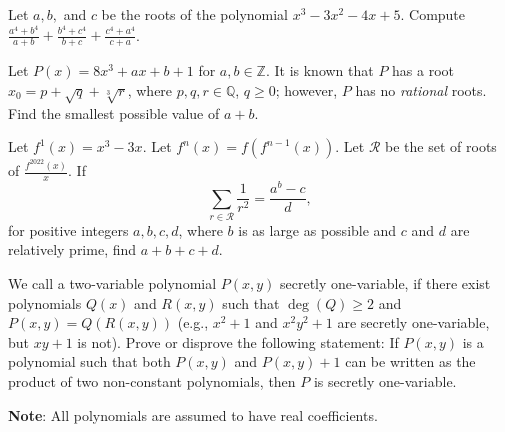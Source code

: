 %	



\begin{question}[name={2022 Stanford Math Tournament, \href{https://artofproblemsolving.com/community/c4h2874565p25539362}{Team Round \#5}}]
	Let $a, b,$ and $c$ be the roots of the polynomial $x^3 - 3x^2 - 4x + 5$. Compute $\frac{a^4 + b^4}{a + b}+\frac{b^4 + c^4}{b + c}+\frac{c^4 + a^4}{c + a}$.
\end{question}



%	


\begin{question}[name={2022 Stanford Math Tournament, \href{https://artofproblemsolving.com/community/c383h3040303p27371394}{Algebra \#9}}]
	Let $P(x)=8x^3+ax+b+1$ for $a,b\in\mathbb{Z}$. It is known that $P$ has a root $x_0=p+\sqrt{q}+\sqrt[3]{r}$, where $p,q,r\in\mathbb{Q}$, $q\ge0$; however, $P$ has no \textit{rational} roots. Find the smallest possible value of $a+b$.	
\end{question}



%	




\begin{question}[name={2022 Stanford Math Tournament, \href{https://artofproblemsolving.com/community/c383h3040320p27371581}{Algebra \#10}}]
	Let $f^1(x)=x^3-3x$. Let $f^n(x)=f(f^{n-1}(x))$. Let $\mathcal{R}$ be the set of roots of $\tfrac{f^{2022}(x)}{x}$. If
	\[\sum_{r\in\mathcal{R}}\frac{1}{r^2}=\frac{a^b-c}{d},\]for positive integers $a,b,c,d$, where $b$ is as large as possible and $c$ and $d$ are relatively prime, find $a+b+c+d$.
\end{question}



%	



\begin{question}[name={2022 Baltic Way, \href{https://artofproblemsolving.com/community/c6h2959346p26504199}{Problem 3}}]
	We call a two-variable polynomial $P(x, y)$ secretly one-variable, if there exist polynomials $Q(x)$ and $R(x, y)$ such that $\deg(Q) \ge 2$ and $P(x, y) = Q(R(x, y))$ (e.g., $x^2 + 1$ and $x^2y^2 +1$ are secretly one-variable, but $xy + 1$ is not). Prove or disprove the following statement: If $P(x, y)$ is a polynomial such that both $P(x, y)$ and $P(x, y) + 1$ can be written as the product of two non-constant polynomials, then $P$ is secretly one-variable.
	
	\textbf{Note}: All polynomials are assumed to have real coefficients.
\end{question}




